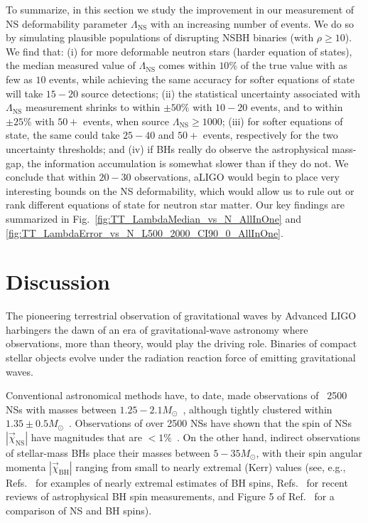 \documentclass[aps,prd,amsmath,floats,floatfix, twocolumn,
superscriptaddress,nofootinbib,showpacs]{revtex4-1}
\newcommand{\lambdans}{\Lambda_\mathrm{NS}}
\begin{document}
To summarize, in this section we study the improvement in our measurement of 
NS deformability parameter $\lambdans$ with an increasing number of events. We
do so by simulating plausible populations of disrupting NSBH binaries (with
$\rho\geq 10$). We find that:
(i) for more deformable neutron stars (harder equation of states), the median
measured value of $\lambdans$ comes within $10\%$ of the true value with as 
few as $10$ events, while achieving the same accuracy for softer equations of 
state will take $15-20$ source detections; (ii) the statistical uncertainty
associated with $\lambdans$ measurement shrinks to within $\pm50\%$ with
$10-20$ events, and to within $\pm 25\%$ with $50+$ events, when source 
$\lambdans\geq 1000$; (iii) for softer equations of state, the same could take
$25-40$ and $50+$ events, respectively for the two uncertainty thresholds;
and (iv) if BHs really do observe the astrophysical mass-gap, the information
accumulation is somewhat slower than if they do not. We conclude that within
$20-30$ observations, aLIGO would begin to place very interesting bounds on 
the NS deformability, which would allow us to rule out or rank different
equations of state for neutron star matter. Our key findings are 
summarized in Fig.~\ref{fig:TT_LambdaMedian_vs_N_AllInOne} and
\ref{fig:TT_LambdaError_vs_N_L500_2000_CI90_0_AllInOne}.





\section{Discussion}\label{s1:discussion}


The pioneering terrestrial observation of gravitational waves by Advanced LIGO
harbingers the dawn of an era of gravitational-wave astronomy where 
observations, more than theory, would play the driving role. Binaries of 
compact stellar objects evolve under the radiation reaction force of emitting
gravitational waves.


Conventional astronomical methods have, to date, made observations of ~2500
NSs with masses between $1.25-2.1 M_\odot$~\cite{Lyne:2004cj,
Demorest:2010bx,2013Sci...340..448A,atnfcatalog,mcgillmagnetarcatalog,
stellarcollapsemass}, although
tightly clustered within $1.35\pm0.5M_\odot$~\cite{stellarcollapsemass}.
%
Observations of over 2500 NSs have shown that the spin of NSs
$|\vec{\chi}_\mathrm{NS}|$ have magnitudes that are $<1\%$~\cite{Miller:2014aaa}.
%
On the other hand, indirect observations of stellar-mass BHs place their
masses between $5-35M_\odot$, with their spin angular momenta 
$|\vec{\chi}_\mathrm{BH}|$ ranging from small to nearly extremal (Kerr) values
(see, e.g., Refs.~\cite{McClintockEtAl:2006,Miller:2009cw,Gou:2014una} for 
examples of nearly extremal estimates of BH spins, Refs.~\cite{McClintock:2013vwa,
Reynolds:2013qqa} for recent reviews of astrophysical BH spin measurements,
and Figure 5 of Ref.~\cite{Miller:2014aaa} for a comparison of NS and BH spins).
\end{document}

